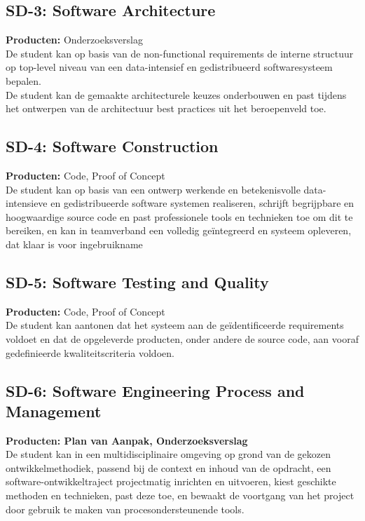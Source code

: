 \subsection{SD-3: Software Architecture}
\textbf{Producten:} Onderzoeksverslag \\
De student kan op basis van de non-functional requirements de interne structuur op top-level niveau van een data-intensief en gedistribueerd softwaresysteem bepalen.
\\
De student kan de gemaakte architecturele keuzes onderbouwen en past tijdens het ontwerpen van de architectuur best practices uit het beroepenveld toe.

\subsection{SD-4: Software Construction}
\textbf{Producten:} Code, Proof of Concept \\
De student kan op basis van een ontwerp werkende en betekenisvolle data- intensieve en gedistribueerde software systemen realiseren, schrijft begrijpbare en hoogwaardige source code en past professionele tools en technieken toe om dit te bereiken, en kan in teamverband een volledig geïntegreerd en systeem opleveren, dat klaar is voor ingebruikname

\subsection{SD-5: Software Testing and Quality}
\textbf{Producten:} Code, Proof of Concept \\
De student kan aantonen dat het systeem aan de geïdentificeerde requirements voldoet en dat de opgeleverde producten, onder andere de source code, aan vooraf gedefinieerde kwaliteitscriteria voldoen.

\newpage
\subsection{SD-6: Software Engineering Process and Management}
\textbf{Producten: Plan van Aanpak, Onderzoeksverslag} \\
De student kan in een multidisciplinaire omgeving op grond van de gekozen ontwikkelmethodiek, passend bij de context en inhoud van de opdracht, een software-ontwikkeltraject projectmatig inrichten en uitvoeren, kiest geschikte methoden en technieken, past deze toe, en bewaakt de voortgang van het project door gebruik te maken van procesondersteunende tools.

